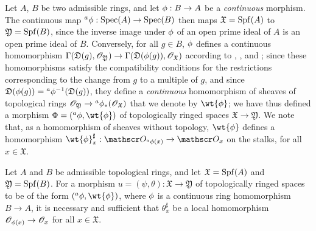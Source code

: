 \begin{env}[10.2.1]
\label{1.10.2.1}
Let $A$, $B$ be two admissible rings, and let $\vphi:B\to A$ be a \emph{continuous} morphism.
The continuous map ${}^a\vphi:\Spec(A)\to\Spec(B)$  then maps $\mathfrak{X}=\operatorname{Spf}(A)$ to $\mathfrak{Y}=\operatorname{Spf}(B)$, since the inverse image under $\phi$ of an open prime ideal of $A$ is an open prime ideal of $B$.
Conversely, for all $g\in B$, $\phi$ defines a continuous homomorphism $\Gamma(\mathfrak{D}(g),\sh{O}_\mathfrak{Y})\to\Gamma(\mathfrak{D}(\vphi(g)),\sh{O}_\mathfrak{X})$ according to , , and ;
since these homomorphisms satisfy the compatibility conditions for the restrictions corresponding to the change from $g$ to a multiple of $g$, and since $\mathfrak{D}(\phi(g))={}^a\phi^{-1}(\mathfrak{D}(g))$, they define a \emph{continuous} homomorphism of sheaves of topological rings $\sh{O}_\mathfrak{Y}\to{}^a\vphi_*(\sh{O}_\mathfrak{X})$  that we denote by $\wt{\vphi}$;
we have thus defined a morphism $\Phi=({}^a\vphi,\wt{\vphi})$ of topologically ringed spaces $\mathfrak{X}\to\mathfrak{Y}$.
We note that, as a homomorphism of sheaves without topology, $\wt{\vphi}$ defines a homomorphism $\wt{\vphi}_x^\sharp:\sh{O}_{{}^a\vphi(x)}\to\sh{O}_x$ on the stalks, for all $x\in\mathfrak{X}$.
\end{env}

\begin{proposition}[10.2.2]
\label{1.10.2.2}
Let $A$ and $B$ be admissible topological rings, and let $\mathfrak{X}=\operatorname{Spf}(A)$ and $\mathfrak{Y}=\operatorname{Spf}(B)$.
For a morphism $u=(\psi,\theta):\mathfrak{X}\to\mathfrak{Y}$ of topologically ringed spaces to be of the form $({}^a\vphi,\wt{\vphi})$, where $\phi$ is a continuous ring homomorphism $B\to A$, it is necessary and sufficient that $\theta_x^\sharp$ be a local homomorphism $\sh{O}_{\vphi(x)}\to\sh{O}_x$ for all $x\in\mathfrak{X}$.
\end{proposition}

